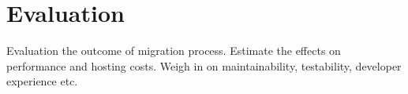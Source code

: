 \chapter{Evaluation} \label{cha:evaluation}

Evaluation the outcome of migration process. Estimate the effects on performance and hosting costs. Weigh in on maintainability, testability, developer experience etc.

